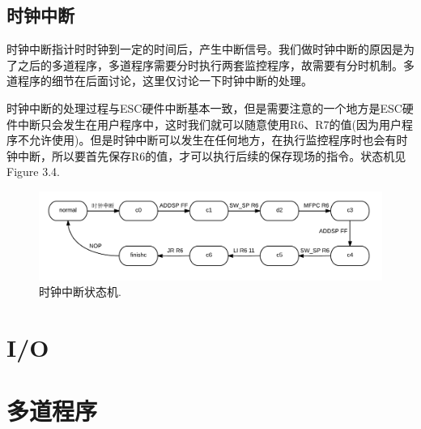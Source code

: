 \subsection{时钟中断}

时钟中断指计时时钟到一定的时间后，产生中断信号。我们做时钟中断的原因是为了之后的多道程序，多道程序需要分时执行两套监控程序，故需要有分时机制。多道程序的细节在后面讨论，这里仅讨论一下时钟中断的处理。

时钟中断的处理过程与ESC硬件中断基本一致，但是需要注意的一个地方是ESC硬件中断只会发生在用户程序中，这时我们就可以随意使用R6、R7的值(因为用户程序不允许使用)。但是时钟中断可以发生在任何地方，在执行监控程序时也会有时钟中断，所以要首先保存R6的值，才可以执行后续的保存现场的指令。状态机见Figure 3.4.

\begin{figure}[H]
  \includegraphics[width=\linewidth]{Figures/clock.png}
  \caption{时钟中断状态机.}
\end{figure}




\section{I/O}


\section{多道程序}

